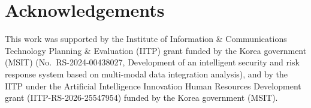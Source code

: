 \section{Acknowledgements}
This work was supported by the Institute of Information \& Communications Technology Planning \& Evaluation (IITP) grant funded by the Korea government (MSIT) (No.~RS-2024-00438027, Development of an intelligent security and risk response system based on multi-modal data integration analysis), and by the IITP under the Artificial Intelligence Innovation Human Resources Development grant (IITP-RS-2026-25547954) funded by the Korea government (MSIT).


